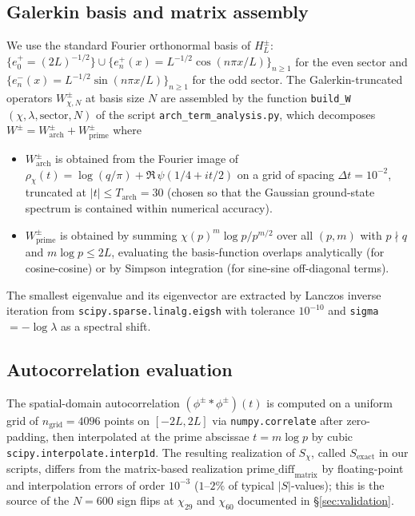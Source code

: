 \documentclass[a4paper,10pt,twocolumn]{article}
\theoremstyle{definition}
\theoremstyle{remark}
\newcommand{\chifn}{\chi}
\begin{document}
\subsection{Galerkin basis and matrix assembly}
We use the standard Fourier orthonormal basis of $H_L^\pm$:
$\{e_0^+=(2L)^{-1/2}\}\cup\{e_n^+(x)=L^{-1/2}\cos(n\pi x/L)\}_{n\geq 1}$
for the even sector and
$\{e_n^-(x)=L^{-1/2}\sin(n\pi x/L)\}_{n\geq 1}$ for the odd sector.
The Galerkin-truncated operators $W^{\pm}_{\chifn,N}$ at basis size
$N$ are assembled by the function
\texttt{build\_W}$(\chifn,\lambda,\mathrm{sector},N)$ of the script
\texttt{arch\_term\_analysis.py}, which decomposes
$W^\pm = W^\pm_{\mathrm{arch}} + W^\pm_{\mathrm{prime}}$ where
\begin{itemize}
\item[(i)] $W^\pm_{\mathrm{arch}}$ is obtained from the Fourier image
  of $\rho_{\chifn}(t)=\log(q/\pi)+\Re\,\psi(1/4+it/2)$ on a grid of
  spacing $\Delta t=10^{-2}$, truncated at $|t|\leq T_{\mathrm{arch}}=
  30$ (chosen so that the Gaussian ground-state spectrum is contained
  within numerical accuracy).
\item[(ii)] $W^\pm_{\mathrm{prime}}$ is obtained by summing
  $\chifn(p)^m\log p/p^{m/2}$ over all $(p,m)$ with $p\nmid q$ and
  $m\log p\leq 2L$, evaluating the basis-function overlaps
  analytically (for cosine-cosine) or by Simpson integration (for
  sine-sine off-diagonal terms).
\end{itemize}
The smallest eigenvalue and its eigenvector are extracted by
Lanczos inverse iteration from \texttt{scipy.sparse.linalg.eigsh}
with tolerance $10^{-10}$ and \texttt{sigma}$=-\log\lambda$ as a
spectral shift.

\subsection{Autocorrelation evaluation}
The spatial-domain autocorrelation
$(\phi^\pm\ast\phi^\pm)(t)$ is computed on a uniform grid of $n_{
\mathrm{grid}}=4096$ points on $[-2L,2L]$ via \texttt{numpy.correlate}
after zero-padding, then interpolated at the prime abscissae
$t=m\log p$ by cubic \texttt{scipy.interpolate.interp1d}. The
resulting realization of $S_{\chifn}$, called $S_{\mathrm{exact}}$
in our scripts, differs from the matrix-based realization
$\mathrm{prime\_diff}_{\mathrm{matrix}}$ by floating-point and
interpolation errors of order $10^{-3}$ ($1$--$2\%$ of typical
$|S|$-values); this is the source of the $N=600$ sign flips at
$\chifn_{29}$ and $\chifn_{60}$ documented in
\S\ref{sec:validation}.
\end{document}
